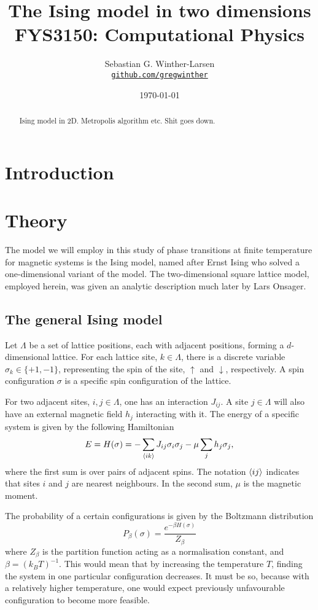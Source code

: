 \documentclass[10pt,a4paper]{amsart}
\title[Ising model in 2d]{The Ising model in two dimensions \\ 
	\hrulefill\small{ FYS3150: Computational Physics }\hrulefill}
\author[Winther-Larsen]{Sebastian G. Winther-Larsen \\
\href{https://github.com/gregwinther/FYS3150/}{\texttt{github.com/gregwinther}}}
\date{\today}
\begin{document}
\begin{titlepage}
\begin{abstract}
Ising model in 2D. Metropolis algorithm etc. Shit goes down.
\end{abstract}
\maketitle
\tableofcontents
\end{titlepage}

\section{Introduction}

\section{Theory}
The model we will employ in this study of phase transitions at finite temperature for magnetic systems is the Ising model, named after Ernst Ising who solved a one-dimensional variant of the model\cite{Ising}. The two-dimensional square lattice model, employed herein, was given an analytic description much later by Lars Onsager\cite{Onsager}.

\subsection{The general Ising model}
Let $\Lambda$ be a set of lattice positions, each with adjacent positions, forming a $d$-dimensional lattice. For each lattice site, $k \in \Lambda$, there is a discrete variable $\sigma_k \in \{+1,-1\}$, representing the spin of the site, $\uparrow$ and $\downarrow$, respectively. A spin configuration $\sigma$ is a specific spin configuration of the lattice.

For two adjacent sites, $i,j \in \Lambda$, one has an interaction $J_{ij}$. A site $j \in \Lambda$ will also have an external magnetic field $h_j$ interacting with it. The energy of a specific system is given by the following Hamiltonian
\begin{equation}
\label{eq:IsingHamilton}
E = H(\sigma)= -\sum_{\ev{ik}}J_{ij}\sigma_i \sigma_j - \mu \sum_j h_j \sigma_j,
\end{equation}
where the first sum is over pairs of adjacent spins. The notation $\ev{ij}$ indicates that sites $i$ and $j$ are nearest neighbours. In the second sum, $\mu$ is the magnetic moment.

The probability of a certain configurations is given by the Boltzmann distribution
\begin{equation}
\label{eq:Boltzmann}
P_\beta(\sigma) = \frac{e^{-\beta H(\sigma)}}{Z_\beta}
\end{equation}
where $Z_\beta$ is the partition function acting as a normalisation constant, and $\beta=(k_BT)^{-1}$. This would mean that by increasing the temperature $T$, finding the system in one particular configuration decreases. It must be so, because with a relatively higher temperature, one would expect previously unfavourable configuration to become more feasible.
\end{document}
